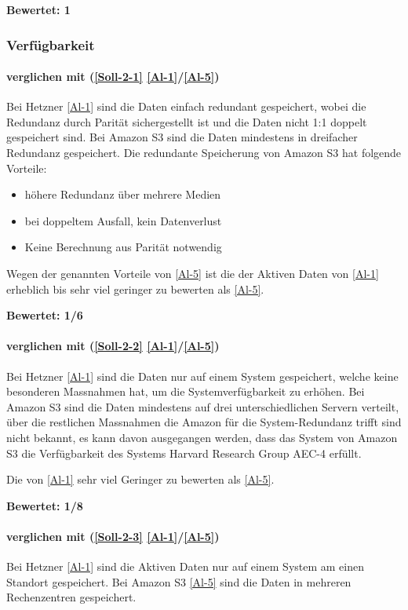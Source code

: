 \textbf{Bewertet: 1}


\subsubsection{Verfügbarkeit}

\paragraph*{  verglichen mit  (\ref{Soll-2-1} \ref{Al-1}/\ref{Al-5})}
Bei Hetzner \ref{Al-1} sind die Daten einfach redundant gespeichert, wobei die Redundanz durch Parität sichergestellt ist und die Daten nicht 1:1 doppelt gespeichert sind. Bei Amazon S3 sind die Daten mindestens in dreifacher Redundanz gespeichert. Die redundante Speicherung von Amazon S3 hat folgende Vorteile:

\begin{itemize}
\item höhere Redundanz über mehrere Medien
\item bei doppeltem Ausfall, kein Datenverlust
\item Keine Berechnung aus Parität notwendig
\end{itemize}

Wegen der genannten Vorteile von \ref{Al-5} ist die  der Aktiven Daten von \ref{Al-1} erheblich bis sehr viel geringer zu bewerten als \ref{Al-5}.

\textbf{Bewertet: 1/6}

\paragraph*{  verglichen mit  (\ref{Soll-2-2} \ref{Al-1}/\ref{Al-5})}
Bei Hetzner \ref{Al-1} sind die Daten nur auf einem System gespeichert, welche keine besonderen Massnahmen hat, um die Systemverfügbarkeit zu erhöhen. Bei Amazon S3 sind die Daten mindestens auf drei unterschiedlichen Servern verteilt, über die restlichen Massnahmen die Amazon für die System-Redundanz trifft sind nicht bekannt, es kann davon ausgegangen werden, dass das System von Amazon S3 die Verfügbarkeit des Systems Harvard Research Group AEC-4 erfüllt.

Die  von \ref{Al-1} sehr viel Geringer zu bewerten als \ref{Al-5}.

\textbf{Bewertet: 1/8}

\paragraph*{  verglichen mit  (\ref{Soll-2-3} \ref{Al-1}/\ref{Al-5})}
Bei Hetzner \ref{Al-1} sind die Aktiven Daten nur auf einem System am einen Standort gespeichert. Bei Amazon S3 \ref{Al-5} sind die Daten in mehreren Rechenzentren gespeichert.

